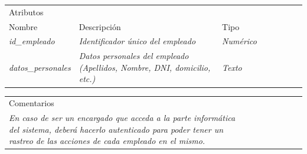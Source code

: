 \begin{table}[H]
    \begin{tabular}{llllllll}
    \cline{1-3}
    \multicolumn{3}{|l|}{\cellcolor[HTML]{F2F2F2}Atributos}                                                                                                                                                                                                    &  &  &  &  &  \\ \cline{1-3}
    \multicolumn{1}{|l|}{Nombre}                                              & \multicolumn{1}{l|}{Descripción}                                                                               & \multicolumn{1}{l|}{Tipo}                                     &  &  &  &  &  \\ \cline{1-3}
    \multicolumn{1}{|l|}{{\color[HTML]{B7B7B7} \textit{id\_empleado}}}      & \multicolumn{1}{l|}{{\color[HTML]{B7B7B7} \textit{Identificador único del empleado}}} & \multicolumn{1}{l|}{{\color[HTML]{B7B7B7} \textit{Numérico}}}    &  &  &  &  &  \\ \cline{1-3}
    \multicolumn{1}{|l|}{{\color[HTML]{B7B7B7} \textit{datos\_personales}}}         & \multicolumn{1}{p{10cm}|}{{\color[HTML]{B7B7B7} \textit{Datos personales del empleado (Apellidos, Nombre, DNI, domicilio, etc.)}}}                           & \multicolumn{1}{l|}{{\color[HTML]{B7B7B7} \textit{Texto}}} &  &  &  &  &  \\ \cline{1-3}
    \end{tabular}
\end{table}

\begin{table}[H]
    \begin{tabular}{llllllll}
    \cline{1-1}
    \multicolumn{1}{|l|}{\cellcolor[HTML]{F2F2F2}Comentarios}                                                                                                                                                                                                                                                                      &  &  &  &  &  &  &  \\ \cline{1-1}
    \multicolumn{1}{|p{15cm}|}{{\color[HTML]{CCCCCC} \textit{En caso de ser un encargado que acceda a la parte informática del sistema, deberá hacerlo autenticado para poder tener un rastreo de las acciones de cada empleado en el mismo.}}} &  &  &  &  &  &  &  \\ \cline{1-1}
    \end{tabular}
\end{table}





















